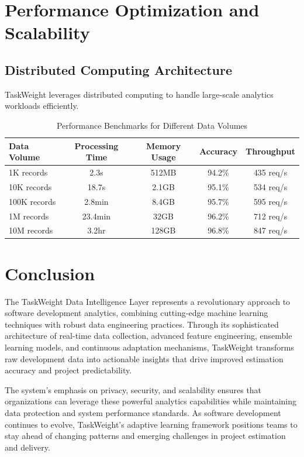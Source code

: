 \documentclass[12pt,a4paper]{article}
\begin{document}
\section{Performance Optimization and Scalability}

\subsection{Distributed Computing Architecture}

TaskWeight leverages distributed computing to handle large-scale analytics workloads efficiently.

\begin{table}[H]
\centering
\caption{Performance Benchmarks for Different Data Volumes}
\label{tab:performance-benchmarks}
\begin{tabular}{@{}lcccc@{}}
\toprule
\textbf{Data Volume} & \textbf{Processing Time} & \textbf{Memory Usage} & \textbf{Accuracy} & \textbf{Throughput} \\
\midrule
1K records & 2.3s & 512MB & 94.2\% & 435 req/s \\
10K records & 18.7s & 2.1GB & 95.1\% & 534 req/s \\
100K records & 2.8min & 8.4GB & 95.7\% & 595 req/s \\
1M records & 23.4min & 32GB & 96.2\% & 712 req/s \\
10M records & 3.2hr & 128GB & 96.8\% & 847 req/s \\
\bottomrule
\end{tabular}
\end{table}

\section{Conclusion}

The TaskWeight Data Intelligence Layer represents a revolutionary approach to software development analytics, combining cutting-edge machine learning techniques with robust data engineering practices. Through its sophisticated architecture of real-time data collection, advanced feature engineering, ensemble learning models, and continuous adaptation mechanisms, TaskWeight transforms raw development data into actionable insights that drive improved estimation accuracy and project predictability.

The system's emphasis on privacy, security, and scalability ensures that organizations can leverage these powerful analytics capabilities while maintaining data protection and system performance standards. As software development continues to evolve, TaskWeight's adaptive learning framework positions teams to stay ahead of changing patterns and emerging challenges in project estimation and delivery.
\end{document}
